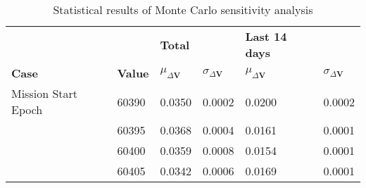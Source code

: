\begin{table}[h!]
\centering
\begin{tabular}{llllll}
 &  & \cellcolor[HTML]{EFEFEF}\textbf{Total} &  & \cellcolor[HTML]{EFEFEF}\textbf{Last 14 days} &  \\
\rowcolor[HTML]{EFEFEF} 
\textbf{Case} & \textbf{Value} & \textbf{$\mu_{\Delta \boldsymbol{V}}$} & \textbf{$\sigma_{\Delta \boldsymbol{V}}$} & \textbf{$\mu_{\Delta \boldsymbol{V}}$} & \textbf{$\sigma_{\Delta \boldsymbol{V}}$} \\ 
Mission Start Epoch & 60390 & 0.0350 & 0.0002 & 0.0200 & 0.0002 \\ 
 & 60395 & 0.0368 & 0.0004 & 0.0161 & 0.0001 \\ 
 & 60400 & 0.0359 & 0.0008 & 0.0154 & 0.0001 \\ 
 & 60405 & 0.0342 & 0.0006 & 0.0169 & 0.0001 \\ 
\end{tabular}
\caption{Statistical results of Monte Carlo sensitivity analysis}
\label{tab:SensitivityAnalysis}
\end{table}